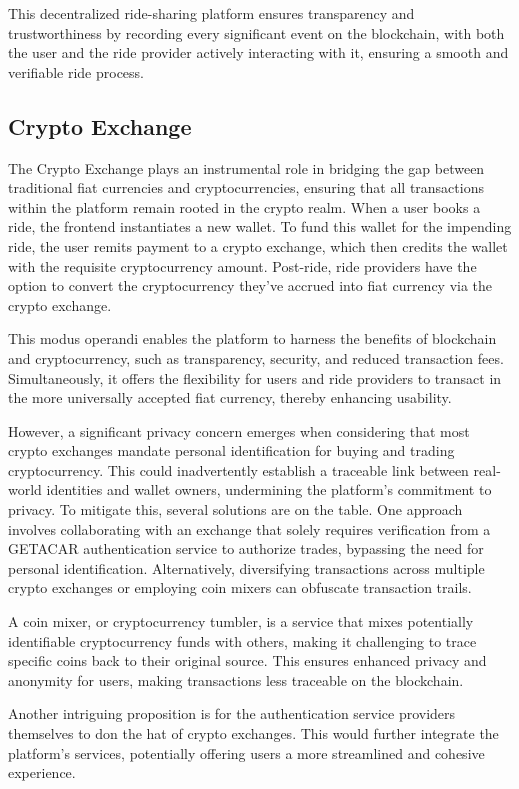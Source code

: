 This decentralized ride-sharing platform ensures transparency and trustworthiness by recording every significant event on the blockchain, with both the user and the ride provider actively interacting with it, ensuring a smooth and verifiable ride process.


\subsection{Crypto Exchange}

The Crypto Exchange plays an instrumental role in bridging the gap between traditional fiat currencies and cryptocurrencies, ensuring that all transactions within the platform remain rooted in the crypto realm. When a user books a ride, the frontend instantiates a new wallet. To fund this wallet for the impending ride, the user remits payment to a crypto exchange, which then credits the wallet with the requisite cryptocurrency amount. Post-ride, ride providers have the option to convert the cryptocurrency they've accrued into fiat currency via the crypto exchange.

This modus operandi enables the platform to harness the benefits of blockchain and cryptocurrency, such as transparency, security, and reduced transaction fees. Simultaneously, it offers the flexibility for users and ride providers to transact in the more universally accepted fiat currency, thereby enhancing usability.

However, a significant privacy concern emerges when considering that most crypto exchanges mandate personal identification for buying and trading cryptocurrency. This could inadvertently establish a traceable link between real-world identities and wallet owners, undermining the platform's commitment to privacy. To mitigate this, several solutions are on the table. One approach involves collaborating with an exchange that solely requires verification from a GETACAR authentication service to authorize trades, bypassing the need for personal identification. Alternatively, diversifying transactions across multiple crypto exchanges or employing coin mixers can obfuscate transaction trails.

A coin mixer, or cryptocurrency tumbler, is a service that mixes potentially identifiable cryptocurrency funds with others, making it challenging to trace specific coins back to their original source. This ensures enhanced privacy and anonymity for users, making transactions less traceable on the blockchain.

Another intriguing proposition is for the authentication service providers themselves to don the hat of crypto exchanges. This would further integrate the platform's services, potentially offering users a more streamlined and cohesive experience.
 
